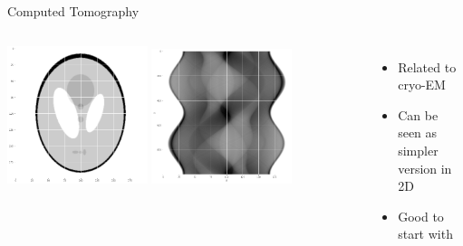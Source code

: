 \documentclass[aspectratio=169]{beamer}
\begin{document}
\begin{frame}[c]{Computed Tomography}
    \begin{columns}[c]
                \includegraphics[width=0.4\textwidth]{phantom.png}
                \includegraphics[width=0.4\textwidth]{phantom_sinogram.png}
                
            \begin{itemize}
                \item Related to cryo-EM
                \item Can be seen as simpler version in 2D
                \item Good to start with
            \end{itemize}
    \end{columns}

\end{frame}

% 
%     
\end{document}
